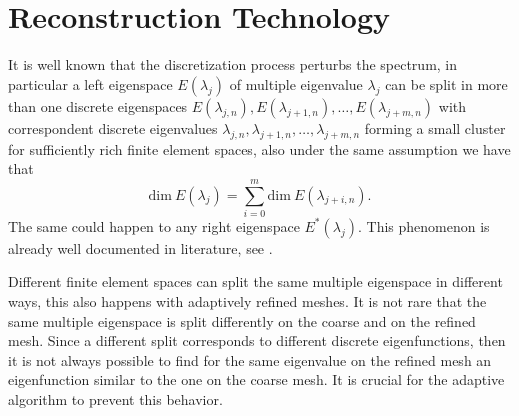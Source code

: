 \documentclass[smallextended]{svjour3}
\begin{document}
 



\section{Reconstruction Technology}\label{sec:reco}

It is well known that the discretization process perturbs the spectrum, in particular a left eigenspace $E(\lambda_j)$ of multiple eigenvalue $\lambda_j$ can be split in more than one discrete eigenspaces $E(\lambda_{j,n}),E(\lambda_{j+1,n}),\dots,E(\lambda_{j+m,n})$ with correspondent discrete eigenvalues $\lambda_{j,n},\lambda_{j+1,n},\dots,\lambda_{j+m,n}$ forming a small cluster for sufficiently rich finite element spaces, also under the same assumption we have that
$$
\mathrm{dim}\ E(\lambda_j)=\sum_{i=0}^m\mathrm{dim}\ E(\lambda_{j+i,n}).
$$
The same could happen to any right eigenspace $E^*(\lambda_j)$.
This phenomenon is already well documented in literature,  see \cite{strang,babuska,hackbusch}.

Different finite element spaces can split the same multiple eigenspace in different ways, this also happens with adaptively refined meshes. It is not rare that the same multiple eigenspace is split differently on the coarse and on the refined mesh. Since a  different split corresponds to different discrete eigenfunctions, then it is not always possible to find for the same eigenvalue on the refined mesh an eigenfunction similar to the one on the coarse mesh. It is crucial for the adaptive algorithm to prevent this behavior.
\end{document}
